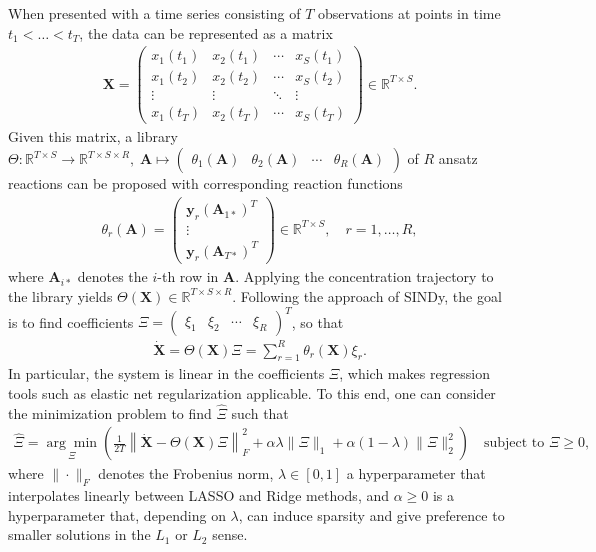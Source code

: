 \documentclass[oneside, abstracton, titlepage]{scrartcl}
\begin{document}
	When presented with a time series consisting of $T$ observations at points in time $t_1<\ldots < t_T$, the data can be represented as a matrix
	\begin{align}
	\textbf{X} = \begin{pmatrix}
		x_1(t_1) & x_2(t_1) & \cdots & x_S(t_1) \\
		x_1(t_2) & x_2(t_2) & \cdots & x_S(t_2) \\
		\vdots   & \vdots   & \ddots & \vdots   \\
		x_1(t_T) & x_2(t_T) & \cdots & x_S(t_T)
	\end{pmatrix} \in \mathbb{R}^{T\times S}.
	\end{align}
	Given this matrix, a library $\Theta: \mathbb{R}^{T\times S}\to \mathbb{R}^{T \times S\times R},\;\mathbf{A}\mapsto \begin{pmatrix} \theta_1(\mathbf{A}) & \theta_2(\mathbf{A}) & \cdots & \theta_R(\mathbf{A}) \end{pmatrix}$ of $R$ ansatz reactions can be proposed with corresponding reaction functions
	\begin{align}
		\theta_r(\mathbf{A}) = \begin{pmatrix}
		\textbf{y}_r(\mathbf{A}_{1*})^T \\ \vdots \\ \textbf{y}_r(\mathbf{A}_{T*})^T
		\end{pmatrix}\in \mathbb{R}^{T\times S},\quad r=1,\ldots,R,
	\label{method:the-reactions}\end{align}
	where $\textbf{A}_{i*}$ denotes the $i$-th row in $\textbf{A}$. Applying the concentration trajectory to the library yields $\Theta(\textbf{X})\in\mathbb{R}^{T\times S\times R}$. Following the approach of SINDy, the goal is to find coefficients $\Xi = \begin{pmatrix} \xi_1 & \xi_2 & \cdots & \xi_R
	\end{pmatrix}^T$, so that
	\begin{align}
	\dot{\textbf{X}} = \Theta(\textbf{X})\Xi = \sum_{r=1}^{R}\theta_r(\textbf{X})\xi_r.
	\end{align}
	In particular, the system is linear in the coefficients $\Xi$, which makes regression tools such as elastic net regularization \cite{Zou2005} applicable. To this end, one can consider the minimization problem to find $\hat{\Xi}$ such that
	\begin{align}
		\hat{\Xi} = \underset{\Xi}{\arg\min}\left( \frac{1}{2T}\left\| \dot{\textbf{X}} - \Theta(\textbf{X})\Xi \right\|_F^2 + \alpha\lambda\|\Xi\|_1 + \alpha(1-\lambda)\|\Xi\|_2^2 \right) \quad \text{subject to }\Xi \geq 0,
	\label{method:minimizationproblem}\end{align}
	where $\|\cdot\|_F$ denotes the Frobenius norm, $\lambda\in[0,1]$ a hyperparameter that interpolates linearly between LASSO \cite{Tibshirani1996, Hastie2009} and Ridge \cite{Hoerl1} methods, and $\alpha\geq 0$ is a hyperparameter that, depending on $\lambda$, can induce sparsity and give preference to smaller solutions in the $L_1$ or $L_2$ sense.
\end{document}

